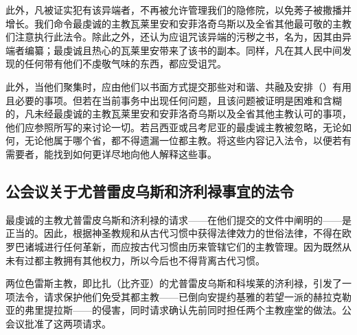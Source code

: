 此外，凡被证实犯有该异端者，不再被允许管理我们的隐修院，以免莠子被撒播并增长。我们命令最虔诚的主教瓦莱里安和安菲洛奇乌斯以及全省其他最可敬的主教们注意执行此法令。除此之外，还认为应诅咒该异端的污秽之书，名为，因其由异端者编纂；最虔诚且热心的瓦莱里安带来了该书的副本。同样，凡在其人民中间发现的任何带有他们不虔敬气味的东西，都应受诅咒。\par

此外，当他们聚集时，应由他们以书面方式提交那些对和谐、共融及安排（）有用且必要的事项。但若在当前事务中出现任何问题，且该问题被证明是困难和含糊的，凡未经最虔诚的主教瓦莱里安和安菲洛奇乌斯以及全省其他主教认可的事项，他们应参照所写的来讨论一切。若吕西亚或吕考尼亚的最虔诚主教被忽略，无论如何，无论他属于哪个省，都不得遗漏一位都主教。将这些内容记入法令，以便若有需要者，能找到如何更详尽地向他人解释这些事。\par


\subsection{公会议关于尤普雷皮乌斯和济利禄事宜的法令}

最虔诚的主教尤普雷皮乌斯和济利禄的请求——在他们提交的文件中阐明的——是正当的。因此，根据神圣教规和从古代习惯中获得法律效力的世俗法律，不得在欧罗巴诸城进行任何革新，而应按古代习惯由历来管辖它们的主教管理。因为既然从未有过都主教拥有其他权力，所以今后也不得背离古代习惯。\par

两位色雷斯主教，即比扎（比齐亚）的尤普雷皮乌斯和科埃莱的济利禄，引发了一项法令，请求保护他们免受其都主教——已倒向安提约基雅的若望一派的赫拉克勒亚的弗里提拉斯——的侵害，同时请求确认先前同时担任两个主教座堂的做法。公会议批准了这两项请求。\par

